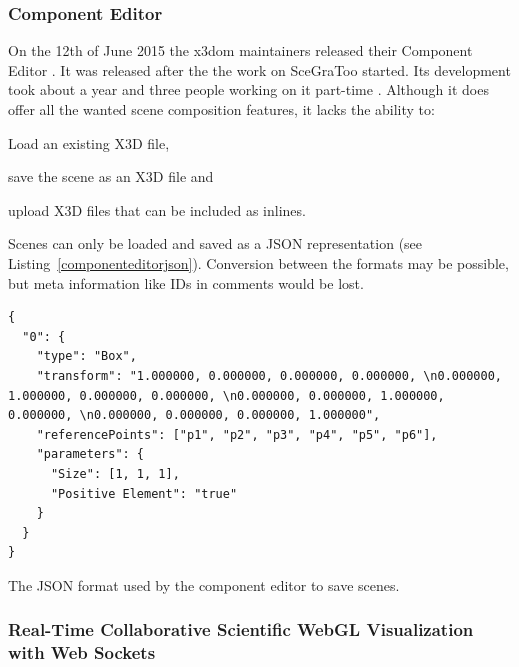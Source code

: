 \clearpage

\subsubsection{Component Editor}
\label{component-editor30}

On the 12th of June 2015 the x3dom maintainers released their Component Editor \cite{componenteditor}.
It was released after the the work on \gls{SceGraToo} started.
Its development took about a year and three people working on it part-time \cite{componenteditoreffort}.
Although it does offer all the wanted scene composition features, it lacks the ability to:

\begin{itemize*}
  \item Load an existing \gls{X3D} file,
  \item save the scene as an \gls{X3D} file and
  \item upload \gls{X3D} files that can be included as inlines.
\end{itemize*}

Scenes can only be loaded and saved as a \gls{JSON} representation (see Listing~\ref{componenteditorjson}).
Conversion between the formats may be possible, but meta information like \glspl{ID} in comments would be lost.

\begin{listing}
  \begin{verbatim}
{
  "0": {
    "type": "Box",
    "transform": "1.000000, 0.000000, 0.000000, 0.000000, \n0.000000, 1.000000, 0.000000, 0.000000, \n0.000000, 0.000000, 1.000000, 0.000000, \n0.000000, 0.000000, 0.000000, 1.000000",
    "referencePoints": ["p1", "p2", "p3", "p4", "p5", "p6"],
    "parameters": {
      "Size": [1, 1, 1],
      "Positive Element": "true"
    }
  }
}
  \end{verbatim}
  \caption{The \gls{JSON} format used by the component editor to save scenes.}
  \label{componenteditorjson}
\end{listing}

\subsubsection{Real-Time Collaborative Scientific WebGL Visualization with Web Sockets}
\label{rtcswvwws}

